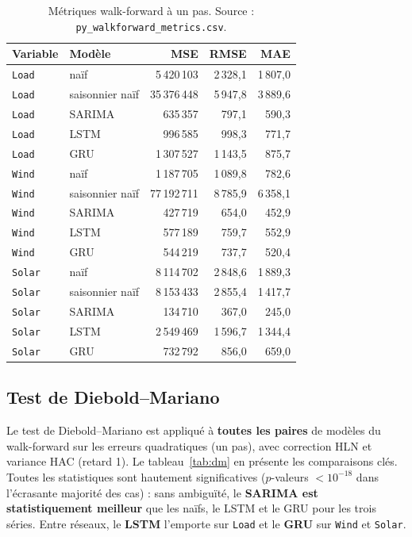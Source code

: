 \begin{table}[H]
\centering
\caption{Métriques walk-forward à un pas.
Source : \texttt{py\_walkforward\_metrics.csv}.}
\label{tab:walkforward}
\small
\begin{tabular}{llrrr}
\toprule
Variable & Modèle & MSE & RMSE & MAE \\
\midrule
\texttt{Load}  & naïf             & 5\,420\,103 & 2\,328{,}1 & 1\,807{,}0 \\
\texttt{Load}  & saisonnier naïf  & 35\,376\,448 & 5\,947{,}8 & 3\,889{,}6 \\
\texttt{Load}  & SARIMA           & 635\,357 & 797{,}1 & 590{,}3 \\
\texttt{Load}  & LSTM             & 996\,585 & 998{,}3 & 771{,}7 \\
\texttt{Load}  & GRU              & 1\,307\,527 & 1\,143{,}5 & 875{,}7 \\
\texttt{Wind}  & naïf             & 1\,187\,705 & 1\,089{,}8 & 782{,}6 \\
\texttt{Wind}  & saisonnier naïf  & 77\,192\,711 & 8\,785{,}9 & 6\,358{,}1 \\
\texttt{Wind}  & SARIMA           & 427\,719 & 654{,}0 & 452{,}9 \\
\texttt{Wind}  & LSTM             & 577\,189 & 759{,}7 & 552{,}9 \\
\texttt{Wind}  & GRU              & 544\,219 & 737{,}7 & 520{,}4 \\
\texttt{Solar} & naïf             & 8\,114\,702 & 2\,848{,}6 & 1\,889{,}3 \\
\texttt{Solar} & saisonnier naïf  & 8\,153\,433 & 2\,855{,}4 & 1\,417{,}7 \\
\texttt{Solar} & SARIMA           & 134\,710 & 367{,}0 & 245{,}0 \\
\texttt{Solar} & LSTM             & 2\,549\,469 & 1\,596{,}7 & 1\,344{,}4 \\
\texttt{Solar} & GRU              & 732\,792 & 856{,}0 & 659{,}0 \\
\bottomrule
\end{tabular}
\end{table}

\subsection{Test de Diebold--Mariano}
Le test de Diebold--Mariano est appliqué à \textbf{toutes les paires} de
modèles du walk-forward sur les erreurs quadratiques (un pas), avec
correction HLN et variance HAC (retard 1). Le tableau~\ref{tab:dm} en
présente les comparaisons clés. Toutes les statistiques sont hautement
significatives (\(p\)-valeurs \(<10^{-18}\) dans l'écrasante majorité des
cas) : sans ambiguïté, le \textbf{SARIMA est statistiquement meilleur} que
les naïfs, le LSTM et le GRU pour les trois séries. Entre réseaux, le
\textbf{LSTM} l'emporte sur \texttt{Load} et le \textbf{GRU} sur
\texttt{Wind} et \texttt{Solar}.

